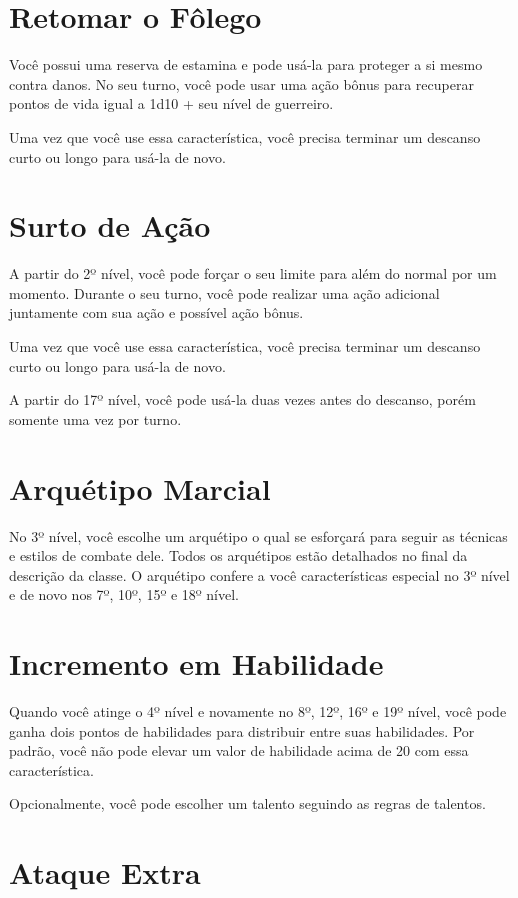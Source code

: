 \documentclass{RPG_Adventure}[2021/10/20]
\begin{document}
\begin{multicols}{2}
\section*{Retomar o Fôlego}%

Você possui uma reserva de estamina e pode usá-la para proteger a si mesmo
contra danos. No seu turno, você pode usar uma ação bônus para recuperar pontos
de vida igual a 1d10 + seu nível de guerreiro.

Uma vez que você use essa característica, você precisa terminar um descanso
curto ou longo para usá-la de novo.

\section*{Surto de Ação}%

A partir do 2º nível, você pode forçar o seu limite para além do normal por um
momento. Durante o seu turno, você pode realizar uma ação adicional juntamente
com sua ação e possível ação bônus.

Uma vez que você use essa característica, você precisa terminar um descanso
curto ou longo para usá-la de novo.

A partir do 17º nível, você pode usá-la duas vezes antes do descanso, porém
somente uma vez por turno.

\section*{Arquétipo Marcial}%

No 3º nível, você escolhe um arquétipo o qual se esforçará para seguir as
técnicas e estilos de combate dele. Todos os arquétipos estão detalhados no
final da descrição da classe. O arquétipo confere a você características
especial no 3º nível e de novo nos 7º, 10º, 15º e 18º nível.

\section*{Incremento em Habilidade}%

Quando você atinge o 4º nível e novamente no 8º, 12º, 16º e 19º nível, você pode
ganha dois pontos de habilidades para distribuir entre suas habilidades. Por
padrão, você não pode elevar um valor de habilidade acima de 20 com essa
característica.

Opcionalmente, você pode escolher um talento seguindo as regras de talentos.

\section*{Ataque Extra}%


\end{multicols}
\end{document}
